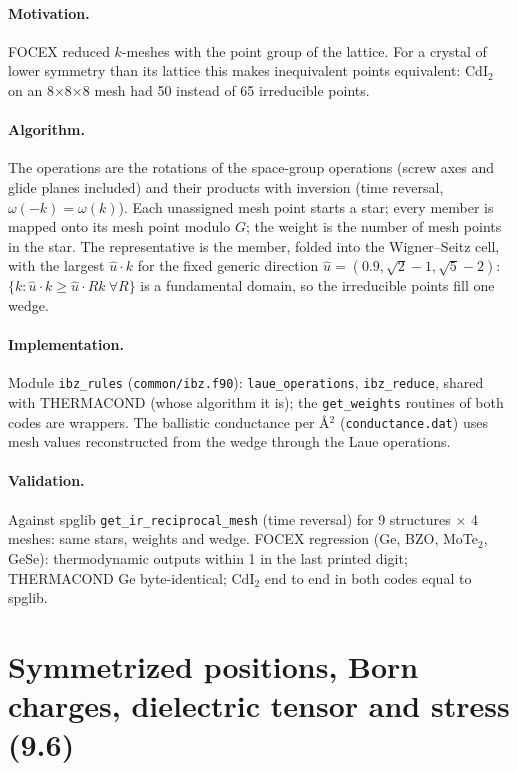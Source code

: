 \documentclass[11pt,a4paper]{article}
\newcommand{\code}[1]{\texttt{#1}}
\begin{document}
\paragraph{Motivation.} FOCEX reduced $k$-meshes with the point group of the lattice. For a crystal of
lower symmetry than its lattice this makes inequivalent points equivalent: CdI$_2$ on an 8$\times$8$\times$8 mesh
had 50 instead of 65 irreducible points.

\paragraph{Algorithm.} The operations are the rotations of the space-group operations (screw axes and
glide planes included) and their products with inversion (time reversal, $\omega(-k)=\omega(k)$). Each
unassigned mesh point starts a star; every member is mapped onto its mesh point modulo $G$; the weight is
the number of mesh points in the star. The representative is the member, folded into the Wigner--Seitz
cell, with the largest $\hat u\cdot k$ for the fixed generic direction $\hat u=(0.9,\sqrt2-1,\sqrt5-2)$:
$\{k:\hat u\cdot k\ge\hat u\cdot Rk\ \forall R\}$ is a fundamental domain, so the irreducible points fill one
wedge.

\paragraph{Implementation.} Module \code{ibz\_rules} (\code{common/ibz.f90}): \code{laue\_operations},
\code{ibz\_reduce}, shared with THERMACOND (whose algorithm it is); the \code{get\_weights} routines of both
codes are wrappers. The ballistic conductance per \AA$^2$ (\code{conductance.dat}) uses mesh values
reconstructed from the wedge through the Laue operations.

\paragraph{Validation.} Against spglib \code{get\_ir\_reciprocal\_mesh} (time reversal) for 9 structures
$\times$ 4 meshes: same stars, weights and wedge. FOCEX regression (Ge, BZO, MoTe$_2$, GeSe): thermodynamic
outputs within 1 in the last printed digit; THERMACOND Ge byte-identical; CdI$_2$ end to end in both codes
equal to spglib.

\section{Symmetrized positions, Born charges, dielectric tensor and stress (9.6)}\label{sec:sym96}
\end{document}
